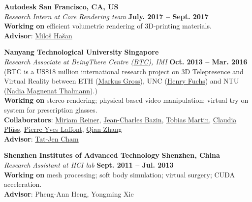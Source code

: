 \documentclass[margin,line]{resume}
\begin{document}
\begin{resume}
    \textbf{Autodesk} \hfill \textbf{San Francisco, CA, US} \\
    \textsl{Research Intern at Core Rendering team} \hfill \textbf{July. 2017 -- Sept. 2017}\\
    \textbf{Working on} efficient volumetric rendering of 3D-printing materials.\\
    \textbf{Advisor}: \href{http://miloshasan.net/}{Milo\v{s} Ha\v{s}an}       
    
    \vspace{0.0mm}
    
    \textbf{Nanyang Technological University} \hfill \textbf{Singapore} \\
    \textsl{Research Associate at BeingThere Centre (\href{https://www.youtube.com/watch?v=Oy-xrxOB_4Q}{BTC}), IMI} \hfill \textbf{Oct. 2013 -- Mar. 2016}\\
    (BTC is a US\$18 million international research project on 3D Telepresence and Virtual Reality between ETH (\href{https://en.wikipedia.org/wiki/Markus_Gross}{Markus Gross}), UNC (\href{https://en.wikipedia.org/wiki/Henry_Fuchs}{Henry Fuchs}) and
    NTU (\href{https://en.wikipedia.org/wiki/Nadia_Magnenat_Thalmann}{Nadia Magnenat Thalmann}).)\\
    \textbf{Working on} stereo rendering; physical-based video manipulation; virtual try-on system for prescription glasses. \\
    \textbf{Collaborators}: \href{http://vrneurocog.wixsite.com/vrneurocog}{Miriam Reiner},
    \href{https://scholar.google.com/citations?user=XPZLx-8AAAAJ&hl=en}{Jean-Charles Bazin},
    \href{https://www.virtamed.com/en/about-us/team/tobias-martin-phd/}{Tobias Martin},
    \href{https://www.crunchbase.com/person/claudia-pluss}{Claudia Pl\"{u}ss},
    \href{http://www.py-laffont.info/}{Pierre-Yves Laffont},
    \href{https://qianzhanginfo.github.io/}{Qian Zhang} \\
    \textbf{Advisor}: \href{http://www.ntu.edu.sg/home/astjcham/}{Tat-Jen Cham} 

    \vspace{0.0mm}
    
    \textbf{Shenzhen Institutes of Advanced Technology}   \hfill \textbf{Shenzhen, China} \\
    \textsl{Research Assistant at HCI lab} \hfill \textbf{Sept. 2011 -- Jul. 2013} \\
    \textbf{Working on} mesh processing; soft body simulation; virtual surgery; CUDA acceleration. \\
    \textbf{Advisor}: Pheng-Ann Heng, Yongming Xie \\


\end{resume}
\end{document}

